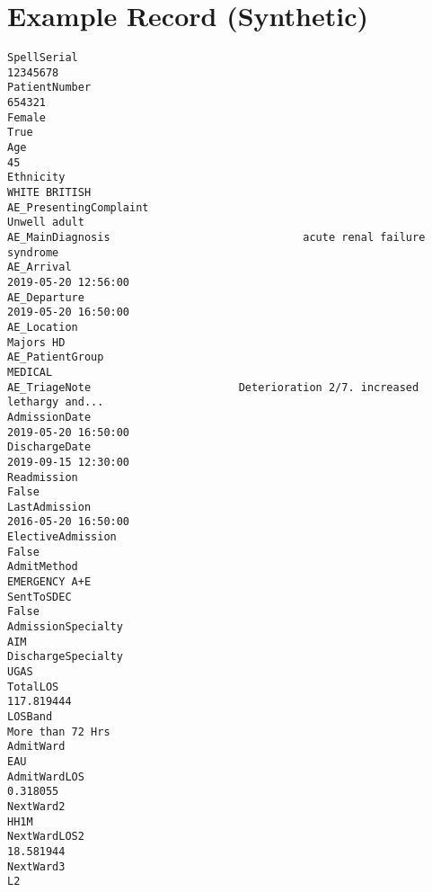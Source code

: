 \documentclass[hf]{ceurart}
\begin{document}
\newpage
\clearpage
\section{Example Record (Synthetic)}
\begin{verbatim}SpellSerial                                                                  12345678
PatientNumber                                                                  654321
Female                                                                           True
Age                                                                                45
Ethnicity                                                               WHITE BRITISH
AE_PresentingComplaint                                                   Unwell adult
AE_MainDiagnosis                              acute renal failure syndrome 
AE_Arrival                                                        2019-05-20 12:56:00
AE_Departure                                                      2019-05-20 16:50:00
AE_Location                                                                 Majors HD
AE_PatientGroup                                                               MEDICAL
AE_TriageNote                       Deterioration 2/7. increased lethargy and...
AdmissionDate                                                     2019-05-20 16:50:00
DischargeDate                                                     2019-09-15 12:30:00
Readmission                                                        False
LastAdmission                                                     2016-05-20 16:50:00
ElectiveAdmission                                                               False
AdmitMethod                                                             EMERGENCY A+E
SentToSDEC                                                        False
AdmissionSpecialty                                                                AIM
DischargeSpecialty                                                               UGAS
TotalLOS                                                                   117.819444
LOSBand                                                              More than 72 Hrs
AdmitWard                                                                         EAU
AdmitWardLOS                                                                 0.318055
NextWard2                                                                        HH1M
NextWardLOS2                                                                18.581944
NextWard3                                                                          L2

\end{verbatim}
\end{document}
